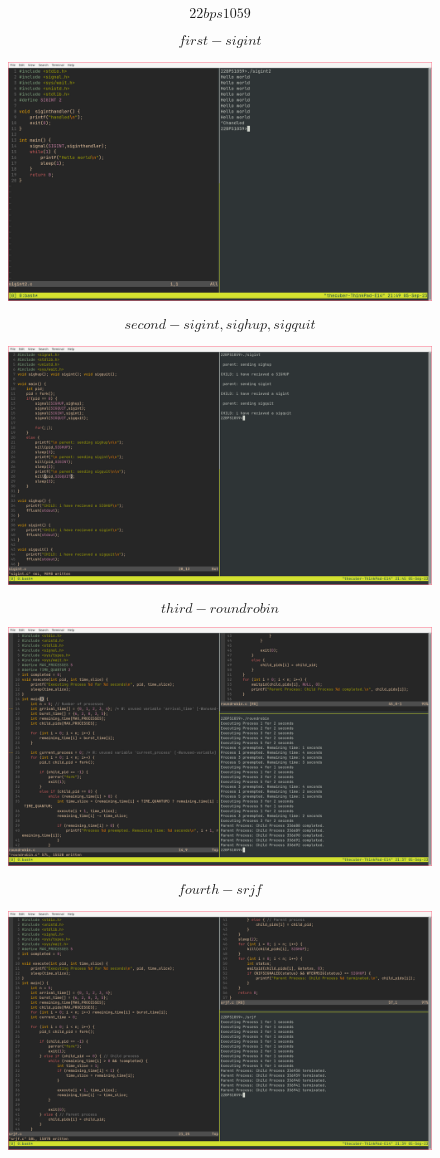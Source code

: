 \documentclass{article}
\begin{document}
$$22bps1059$$
\begin{figure}[htbp]
    $$first-sigint$$ 
   \centerline{ \includegraphics[width=1.5\linewidth]{fig1.png} }
    $$second-sigint,sighup,sigquit$$
   \centerline{ \includegraphics[width=1.5\linewidth]{fig2.png} }
\end{figure}

   \begin{figure}[htbp]
        $$third-roundrobin$$
       \centerline{ \includegraphics[width=1.5\linewidth]{fig3.png} }
        $$fourth-srjf$$
       \centerline{ \includegraphics[width=1.5\linewidth]{fig4.png} }
   \end{figure}
\end{document}

